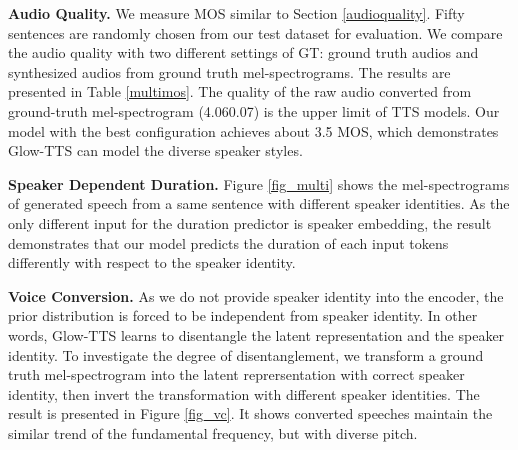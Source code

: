 \documentclass{article}
\begin{document}
\begin{table}[t]
\caption{The Mean Opinion Score (MOS) of a multi-speaker TTS with 95 confidence intervals.}
\label{multimos}
\vskip 0.15in
\begin{center}
\begin{small}
\begin{sc}
\end{sc}
\end{small}
\end{center}
\vskip -0.1in
\end{table}


\textbf{Audio Quality.} We measure MOS similar to Section \ref{audioquality}. Fifty sentences are randomly chosen from our test dataset for evaluation. We compare the audio quality with two different settings of GT: ground truth audios and synthesized audios from ground truth mel-spectrograms. The results are presented in Table \ref{multimos}. The quality of the raw audio converted from ground-truth mel-spectrogram (4.060.07) is the upper limit of TTS models. Our model with the best configuration achieves about 3.5 MOS, which demonstrates Glow-TTS can model the diverse speaker styles.



\textbf{Speaker Dependent Duration.}
Figure \ref{fig_multi} shows the mel-spectrograms of generated speech from a same sentence with different speaker identities. As the only different input for the duration predictor is speaker embedding, the result demonstrates that our model predicts the duration of each input tokens differently with respect to the speaker identity.

\textbf{Voice Conversion.}
As we do not provide speaker identity into the encoder, the prior distribution is forced to be independent from speaker identity. In other words, Glow-TTS learns to disentangle the latent representation  and the speaker identity. To investigate the degree of disentanglement, we transform a ground truth mel-spectrogram into the latent reprersentation with correct speaker identity, then invert the transformation with different speaker identities. The result is presented in Figure \ref{fig_vc}. It shows converted speeches maintain the similar trend of the fundamental frequency, but with diverse pitch.
\end{document}

